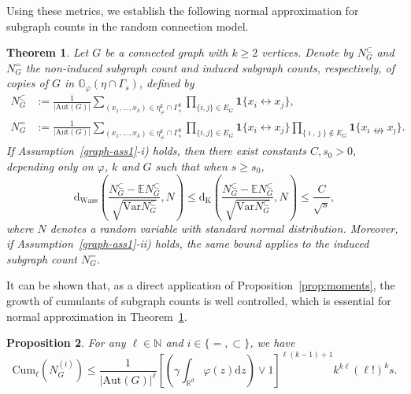 \documentclass{article}
\newtheorem{theorem}{Theorem}[section]
\newtheorem{prop}[theorem]{Proposition}
\theoremstyle{definition}
\numberwithin{equation}{section}
\theoremstyle{remark}
\newcommand{\Var}{\mathrm{Var}}
\newcommand{\cum}{\mathrm{Cum}}
\begin{document}
Using these metrics, we establish the following normal approximation for subgraph counts in the random connection model.
\begin{theorem}\label{propgraph}
Let $G$ be a connected graph with $k\ge2$ vertices.
Denote by $N_G^{\subset}$ and $N_G^{=}$ the non-induced subgraph count and induced subgraph counts, respectively, of copies of $G$ in 
$\mathbb{G}_{\varphi}(\eta\cap\Gamma_s)$, defined by
\begin{align}
	N_G^{\subset}&:=\frac1{|\mathrm{Aut}(G)|}\sum_{(x_1,\dots,x_k)\in\eta^k_{\ne}\cap\Gamma_s^k}\prod_{\{i,j\}\in E_G}\mathbf{1}\{x_i\leftrightarrow x_j\},\label{def:subgraph-count1}\\
	N_G^{=}&:=\frac1{|\mathrm{Aut}(G)|}\sum_{(x_1,\dots,x_k)\in\eta^k_{\ne}\cap\Gamma_s^k}\prod_{\{i,j\}\in E_G}
    \mathbf{1}\{x_i\leftrightarrow x_j\}\prod_{\{\imath,\jmath\}\notin E_G}\mathbf{1}\{x_{\imath}\nleftrightarrow x_{\jmath}\}.\label{def:subgraph-count2}
\end{align}
If Assumption~\ref{graph-ass1}-i) holds, then there exist constants $C,s_0>0$, depending only on $\varphi$, $k$ and $G$ such that when $s\ge s_0$,
\begin{equation}
	\mathrm{d}_{\mathrm{Wass}}\left(\frac{N_G^{\subset}-\mathbb{E} N_G^{\subset}}{\sqrt{\Var N_G^{\subset}}},N\right)\le \mathrm{d}_{\mathrm{K}}\left(\frac{N_G^{\subset}-\mathbb{E} N_G^{\subset}}{\sqrt{\Var N_G^{\subset}}},N\right)\le\frac{C}{\sqrt{s}},
\end{equation}
where $N$ denotes a random variable with standard normal distribution. Moreover, if Assumption~\ref{graph-ass1}-ii) holds, the same bound applies to the induced subgraph count $N_G^{=}$.
\end{theorem}
It can be shown that, 
as a direct application of Proposition~\ref{prop:moments}, the growth of cumulants of subgraph counts is well controlled, which is essential for normal approximation in Theorem~\ref{propgraph}.
\begin{prop}\label{subgraph-cumu-1}
For any $\ell\in\mathbb{N}$ and $i\in\{=,\subset\}$, we have%
\begin{equation}
	\cum_\ell(N_G^{(i)})\le \frac{1}{|\mathrm{Aut}(G)|^\ell}\left[\left(\gamma \int_{\mathbb{R}^d}\varphi(z)\mathrm{d}z\right)\vee1\right]^{\ell(k-1)+1}k^{k\ell}(\ell!)^k s.
\end{equation}
 \end{prop}
\end{document}
